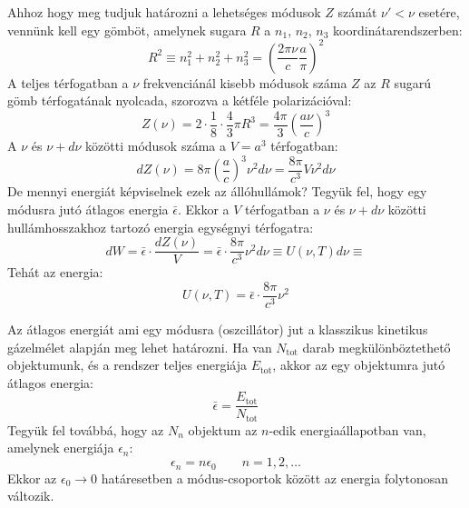 \documentclass[../main.tex]{subfiles}
\begin{document}
Ahhoz hogy meg tudjuk határozni a lehetséges módusok $Z$ számát $\nu' < \nu$ esetére, vennünk kell egy gömböt, amelynek sugara $R$ a $n_1$, $n_2$, $n_3$ koordinátarendszerben:
\begin{equation}
    R^2 \equiv n_1^2 + n_2^2 + n_3^2 = \left( \frac{2 \pi \nu}{c} \frac{a}{\pi} \right)^2
\end{equation}
A teljes térfogatban a $\nu$ frekvenciánál kisebb módusok száma $Z$ az $R$ sugarú gömb térfogatának nyolcada, szorozva a kétféle polarizációval:
\begin{equation}
    Z(\nu) = 2 \cdot \frac{1}{8} \cdot \frac{4}{3} \pi R^3 = \frac{4 \pi}{3} \left( \frac{a \nu}{c} \right)^3
\end{equation}
A $\nu$ és $\nu + d\nu$ közötti módusok száma a $ V = a^3$ térfogatban:
\begin{equation}
    dZ(\nu) = 8 \pi \left( \frac{a}{c} \right)^3 \nu^2 d\nu = \frac{8\pi}{c^3} V \nu^2 d\nu
\end{equation}
De mennyi energiát képviselnek ezek az állóhullámok? Tegyük fel, hogy egy módusra jutó átlagos energia $\bar{\epsilon}$. Ekkor a $V$ térfogatban a $\nu$ és $\nu + d\nu$ közötti hullámhosszakhoz tartozó energia egységnyi térfogatra:
\begin{equation}
    dW = \bar{\epsilon} \cdot \frac{dZ(\nu)}{V} = \bar{\epsilon} \cdot \frac{8\pi}{c^3} \nu^2 d\nu \equiv U(\nu, T) d\nu \equiv 
\end{equation}
Tehát az energia:
\begin{equation}
    U(\nu ,T) = \bar{\epsilon} \cdot \frac{8\pi}{c^3} \nu^2
\end{equation}

Az átlagos energiát ami egy módusra (oszcillátor) jut a klasszikus kinetikus gázelmélet alapján meg lehet határozni. Ha van $N_{\text{tot}}$ darab megkülönböztethető objektumunk, és a rendszer teljes energiája $E_{\text{tot}}$, akkor az egy objektumra jutó átlagos energia:
\begin{equation}
    \bar{\epsilon} = \frac{E_{\text{tot}}}{N_{\text{tot}}}
\end{equation}
Tegyük fel továbbá, hogy az $N_n$ objektum az $n$-edik energiaállapotban van, amelynek energiája $\epsilon_n$:
\begin{equation}
    \epsilon_n = n \epsilon_0 \qquad n = 1, 2, \ldots
\end{equation}
Ekkor az $\epsilon_0 \to 0$ határesetben a módus-csoportok között az energia folytonosan változik.
\end{document}
